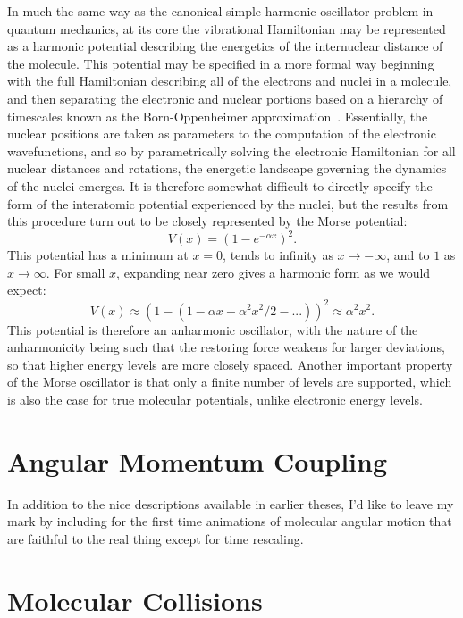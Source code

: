In much the same way as the canonical simple harmonic oscillator problem in quantum mechanics, at its core the vibrational Hamiltonian may be represented as a harmonic potential describing the energetics of the internuclear distance of the molecule.
This potential may be specified in a more formal way beginning with the full Hamiltonian describing all of the electrons and nuclei in a molecule, and then separating the electronic and nuclear portions based on a hierarchy of timescales known as the Born-Oppenheimer approximation~\citep[Sec.~8.1]{Atkins2005}.
Essentially, the nuclear positions are taken as parameters to the computation of the electronic wavefunctions, and so by parametrically solving the electronic Hamiltonian for all nuclear distances and rotations, the energetic landscape governing the dynamics of the nuclei emerges.
It is therefore somewhat difficult to directly specify the form of the interatomic potential experienced by the nuclei, but the results from this procedure turn out to be closely represented by the Morse potential:
\begin{equation}
V(x) = \left(1-e^{-\alpha x}\right)^2.
\end{equation}
This potential has a minimum at $x=0$, tends to infinity as $x\rightarrow-\infty$, and to $1$ as $x\rightarrow\infty$. For small $x$, expanding near zero gives a harmonic form as we would expect:
\begin{equation}
V(x) \approx \left(1-(1-\alpha x + \alpha^2 x^2 / 2 - ...)\right)^2 \approx \alpha^2 x^2.
\end{equation}
This potential is therefore an anharmonic oscillator, with the nature of the anharmonicity being such that the restoring force weakens for larger deviations, so that higher energy levels are more closely spaced.
Another important property of the Morse oscillator is that only a finite number of levels are supported, which is also the case for true molecular potentials, unlike electronic energy levels.


\section{Angular Momentum Coupling}

In addition to the nice descriptions available in earlier theses, I'd like to leave my mark by including for the first time animations of molecular angular motion that are faithful to the real thing except for time rescaling.


\section{Molecular Collisions}



\ifx\justbeingincluded\undefined

\fi
